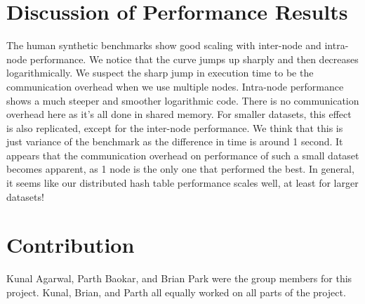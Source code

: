 \documentclass{article}
\begin{document}
\section{Discussion of Performance Results}

The human synthetic benchmarks show good scaling with inter-node and intra-node performance. We notice that the curve jumps up sharply and then decreases logarithmically. We suspect the sharp jump in execution time to be the communication overhead when we use multiple nodes. Intra-node performance shows a much steeper and smoother logarithmic code. There is no communication overhead here as it’s all done in shared memory. For smaller datasets, this effect is also replicated, except for the inter-node performance. We think that this is just variance of the benchmark as the difference in time is around 1 second. It appears that the communication overhead on performance of such a small dataset becomes apparent, as 1 node is the only one that performed the best. In general, it seems like our distributed hash table performance scales well, at least for larger datasets!


\section{Contribution}
Kunal Agarwal, Parth Baokar, and Brian Park were the group members for this project. Kunal, Brian, and Parth all equally worked on all parts of the project.
\end{document}
